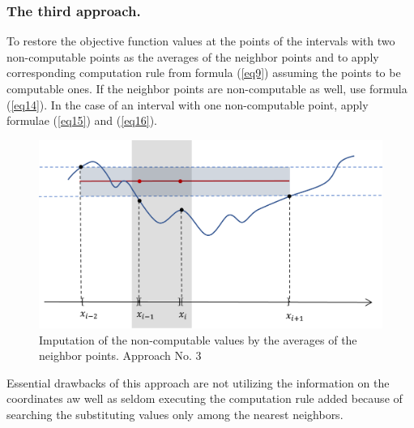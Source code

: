 \documentclass[runningheads]{llncs}
\begin{document}
\subsubsection{The third approach.} To restore the objective function values at the points of the intervals with two non-computable points as the averages of the neighbor points and to apply corresponding computation rule from formula (\ref{eq9}) assuming the points to be computable ones. If the neighbor points are non-computable as well, use formula (\ref{eq14}). In the case of an interval with one non-computable point, apply formulae (\ref{eq15}) and (\ref{eq16}).
\begin{figure}
\includegraphics[width=\textwidth]{fig3.png}
\caption{Imputation of the non-computable values by the averages of the neighbor points. Approach No. 3} \label{fig3}
\end{figure}

Essential drawbacks of this approach are not utilizing the information on the coordinates aw well as seldom executing the computation rule added because of searching the substituting values only among the nearest neighbors.
\end{document}
